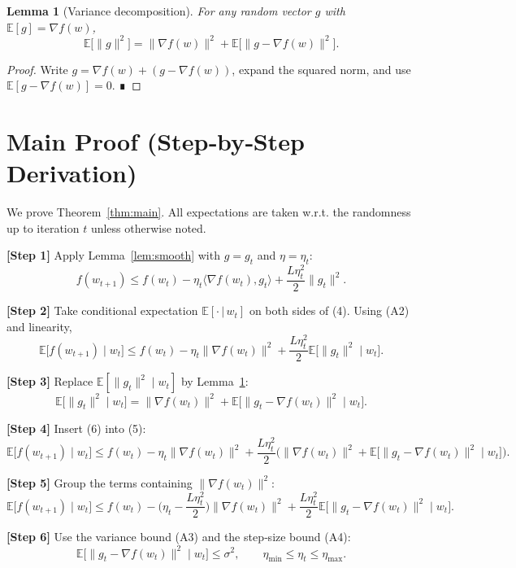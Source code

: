 \documentclass[11pt]{article}
\newtheorem{lemma}{Lemma}
\newcommand{\E}{\mathbb{E}}
\begin{document}
\begin{lemma}[Variance decomposition]\label{lem:var}
For any random vector $g$ with $\E[g]=\nabla f(w)$,
\[
\E\!\big[\|g\|^{2}\big]=\|\nabla f(w)\|^{2}+\E\!\big[\|g-\nabla f(w)\|^{2}\big].
\tag{3}
\]
\end{lemma}
\begin{proof}
Write $g=\nabla f(w)+(g-\nabla f(w))$, expand the squared norm, and use $\E[g-\nabla f(w)]=0$. ∎
\end{proof}

\section*{Main Proof (Step‑by‑Step Derivation)}
We prove Theorem~\ref{thm:main}.  All expectations are taken w.r.t. the randomness up to iteration $t$ unless otherwise noted.

\noindent\textbf{[Step 1]} Apply Lemma~\ref{lem:smooth} with $g=g_{t}$ and $\eta=\eta_{t}$:
\[
f(w_{t+1})\le f(w_{t})-\eta_{t}\langle\nabla f(w_{t}),g_{t}\rangle
+\frac{L\eta_{t}^{2}}{2}\|g_{t}\|^{2}.
\tag{4}
\]

\noindent\textbf{[Step 2]} Take conditional expectation $\E[\cdot\,|\,w_{t}]$ on both sides of (4).  
Using (A2) and linearity,
\[
\E\!\big[f(w_{t+1})\mid w_{t}\big]\le f(w_{t})-\eta_{t}\|\nabla f(w_{t})\|^{2}
+\frac{L\eta_{t}^{2}}{2}\E\!\big[\|g_{t}\|^{2}\mid w_{t}\big].
\tag{5}
\]

\noindent\textbf{[Step 3]} Replace $\E[\|g_{t}\|^{2}\mid w_{t}]$ by Lemma~\ref{lem:var}:
\[
\E\!\big[\|g_{t}\|^{2}\mid w_{t}\big]
= \|\nabla f(w_{t})\|^{2}+\E\!\big[\|g_{t}-\nabla f(w_{t})\|^{2}\mid w_{t}\big].
\tag{6}
\]

\noindent\textbf{[Step 4]} Insert (6) into (5):
\[
\E\!\big[f(w_{t+1})\mid w_{t}\big]\le
f(w_{t})-\eta_{t}\|\nabla f(w_{t})\|^{2}
+\frac{L\eta_{t}^{2}}{2}\Big(\|\nabla f(w_{t})\|^{2}
+\E\!\big[\|g_{t}-\nabla f(w_{t})\|^{2}\mid w_{t}\big]\Big).
\tag{7}
\]

\noindent\textbf{[Step 5]} Group the terms containing $\|\nabla f(w_{t})\|^{2}$:
\[
\E\!\big[f(w_{t+1})\mid w_{t}\big]\le
f(w_{t})-\Big(\eta_{t}-\frac{L\eta_{t}^{2}}{2}\Big)\|\nabla f(w_{t})\|^{2}
+\frac{L\eta_{t}^{2}}{2}\E\!\big[\|g_{t}-\nabla f(w_{t})\|^{2}\mid w_{t}\big].
\tag{8}
\]

\noindent\textbf{[Step 6]} Use the variance bound (A3) and the step‑size bound (A4):
\[
\E\!\big[\|g_{t}-\nabla f(w_{t})\|^{2}\mid w_{t}\big]\le\sigma^{2},
\qquad
\eta_{\min}\le\eta_{t}\le\eta_{\max}.
\tag{9}
\]
\end{document}
